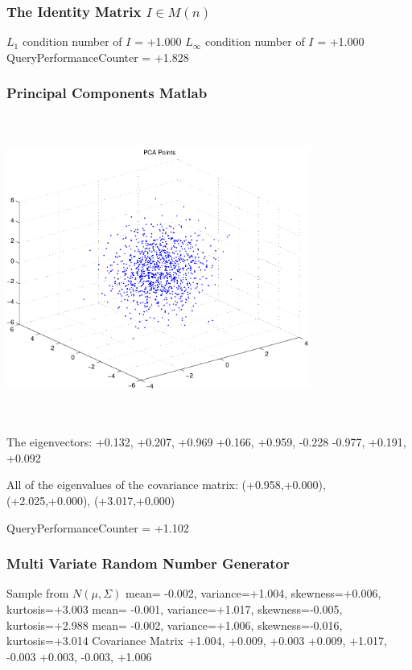 \documentclass[9pt]{article}
\theoremstyle{plain}
\theoremstyle{definition}
\theoremstyle{remark}
\numberwithin{equation}{section}
\begin{document}
\subsubsection{The Identity Matrix $I \in M(n)$}
$L_1$ condition number of $I$ = +1.000
$L_\infty$ condition number of $I$ = +1.000
QueryPerformanceCounter  =  +1.828
\subsubsection{Principal Components Matlab }
\includegraphics[width=10.0cm,height=10.0cm]{PCAPoints.pdf}

The eigenvectors:
+0.132, +0.207, +0.969
+0.166, +0.959, -0.228
-0.977, +0.191, +0.092

All of the eigenvalues of the covariance matrix:
(+0.958,+0.000), (+2.025,+0.000), (+3.017,+0.000)

QueryPerformanceCounter  =  +1.102
\subsubsection{Multi Variate Random Number Generator }
Sample from $N(\mu,\Sigma)$
mean= -0.002, variance=+1.004, skewness=+0.006, kurtosis=+3.003
mean= -0.001, variance=+1.017, skewness=-0.005, kurtosis=+2.988
mean= -0.002, variance=+1.006, skewness=-0.016, kurtosis=+3.014
Covariance Matrix 
+1.004, +0.009, +0.003
+0.009, +1.017, -0.003
+0.003, -0.003, +1.006
\end{document}
